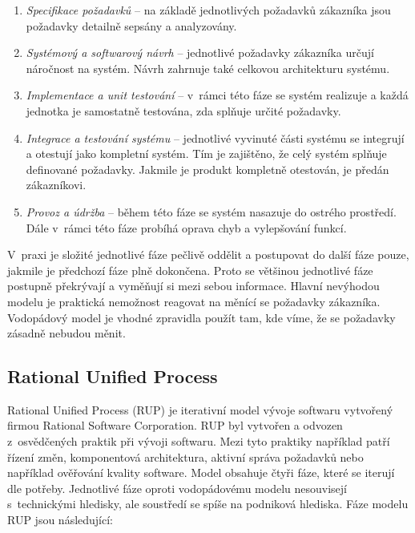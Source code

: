 \documentclass[czech,master]{diploma}
\begin{document}
\begin{enumerate}
\item \textit{Specifikace požadavků} -- na základě jednotlivých požadavků zákazníka jsou požadavky detailně sepsány a analyzovány.

\item \textit{Systémový a softwarový návrh} -- jednotlivé požadavky zákazníka určují náročnost na systém. Návrh zahrnuje také celkovou architekturu systému.

\item \textit{Implementace a unit testování} -- v~rámci této fáze se systém realizuje a každá jednotka je samostatně testována, zda splňuje určité požadavky.

\item \textit{Integrace a testování systému} -- jednotlivé vyvinuté části systému se integrují a otestují jako kompletní systém. Tím je zajištěno, že celý systém splňuje definované požadavky. Jakmile je produkt kompletně otestován, je předán zákazníkovi.

\item \textit{Provoz a údržba} -- během této fáze se systém nasazuje do ostrého prostředí. Dále v~rámci této fáze probíhá oprava chyb a vylepšování funkcí.

\end{enumerate}

V~praxi je složité jednotlivé fáze pečlivě oddělit a postupovat do další fáze pouze, jakmile je předchozí fáze plně dokončena. Proto se většinou jednotlivé fáze postupně překrývají a vyměňují si mezi sebou informace. Hlavní nevýhodou modelu je praktická nemožnost reagovat na měnící se požadavky zákazníka. Vodopádový model je vhodné zpravidla použít tam, kde víme, že se požadavky zásadně nebudou měnit.

\subsection{Rational Unified Process}
Rational Unified Process (RUP) je iterativní model vývoje softwaru vytvořený firmou Rational Software Corporation. RUP byl vytvořen a odvozen z~osvědčených praktik při vývoji softwaru. Mezi tyto praktiky například patří řízení změn, komponentová architektura, aktivní správa požadavků nebo například ověřování kvality software. Model obsahuje čtyři fáze, které se iterují dle potřeby. Jednotlivé fáze oproti vodopádovému modelu nesouvisejí s~technickými hledisky, ale soustředí se spíše na podniková hlediska. \cite{ref:rup_ibm_about} Fáze modelu RUP jsou následující:
\end{document}
